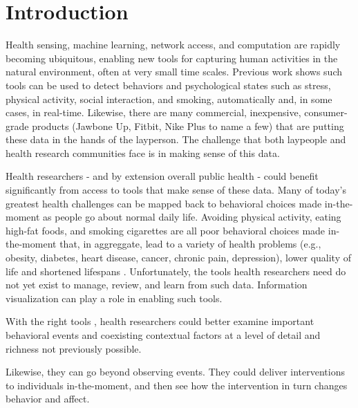 
\section{Introduction} %




Health sensing, machine learning, network access, and computation are rapidly becoming ubiquitous, enabling new tools for capturing human activities in the natural environment, often at very small time scales.  Previous work shows such tools can be used to detect behaviors and psychological states such as stress\cite{chang2011,lu2012}, physical activity\cite{li2010,emken2012}, social interaction\cite{wyatt2011}, and smoking\cite{sazonov2011}, automatically and, in some cases, in real-time. Likewise, there are many commercial, inexpensive, consumer-grade products (Jawbone Up, Fitbit, Nike Plus to name a few) that are putting these data in the hands of the layperson. The challenge that both laypeople and health research communities face is in making sense of this data.

Health researchers - and by extension overall public health - could benefit significantly from access to tools that make sense of these data.    Many of today's greatest health challenges can be mapped back to  behavioral choices made in-the-moment as people go about normal daily life.  Avoiding physical activity, eating high-fat foods, and smoking cigarettes are all poor behavioral choices made in-the-moment that, in aggreggate, lead to a variety of health problems (e.g., obesity, diabetes, heart disease, cancer, chronic pain, depression), lower quality of life and shortened lifespans \cite{franco2005, dunn2001, yanbaeva2007, ross2000}.  Unfortunately, the tools health researchers need do not yet exist to manage, review, and learn from such data.  Information visualization can play a role in enabling such tools.

With the right tools \cite{}, health researchers could better examine important behavioral events and coexisting contextual factors at a level of detail and richness not previously possible.

Likewise, they can go beyond observing events.  They could deliver interventions to individuals in-the-moment, and then see how the intervention in turn changes behavior and affect.


